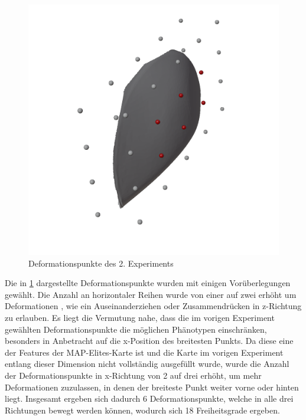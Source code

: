 \begin{figure}[h]
	\centering
	\includegraphics[width=.7\linewidth]{bilder/6ptDeformationPoints}
	\caption{Deformationspunkte des 2. Experiments}
	\label{fig:ffd2nd}
\end{figure}
Die in \cref{fig:ffd2nd} dargestellte Deformationspunkte wurden mit einigen Vorüberlegungen gewählt.
Die Anzahl an horizontaler Reihen wurde von einer auf zwei erhöht um Deformationen , wie ein Auseinanderziehen oder Zusammendrücken in z-Richtung zu erlauben.
Es liegt die Vermutung nahe, dass die im vorigen Experiment gewählten Deformationspunkte die möglichen Phänotypen einschränken, besonders in Anbetracht auf die x-Position des breitesten Punkts.
Da diese eine der Features der MAP-Elites-Karte ist und die Karte im vorigen Experiment entlang dieser Dimension nicht vollständig ausgefüllt wurde, wurde die Anzahl der Deformationspunkte in x-Richtung von 2 auf drei erhöht, um mehr Deformationen zuzulassen, in denen der breiteste Punkt weiter vorne oder hinten liegt.
Insgesamt ergeben sich dadurch 6 Deformationspunkte, welche in alle drei Richtungen bewegt werden können, wodurch sich 18 Freiheitsgrade ergeben.

